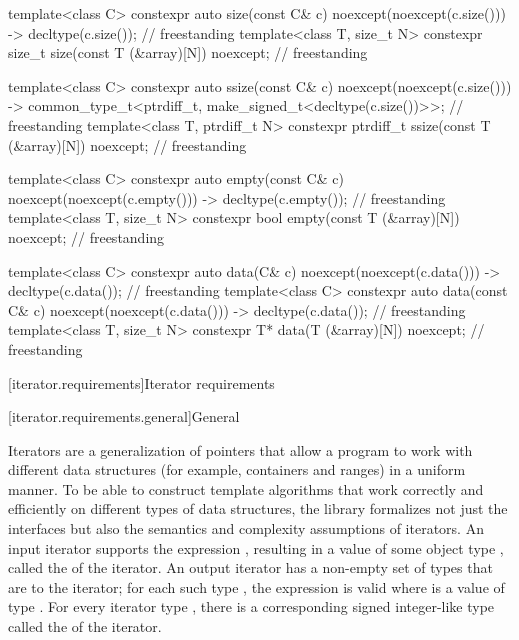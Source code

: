\begin{codeblock}
{  template<class C> constexpr auto
    size(const C& c) noexcept(noexcept(c.size())) -> decltype(c.size());            // freestanding
  template<class T, size_t N> constexpr size_t
    size(const T (&array)[N]) noexcept;                                             // freestanding

  template<class C> constexpr auto
    ssize(const C& c) noexcept(noexcept(c.size()))
      -> common_type_t<ptrdiff_t, make_signed_t<decltype(c.size())>>;               // freestanding
  template<class T, ptrdiff_t N> constexpr ptrdiff_t
    ssize(const T (&array)[N]) noexcept;                                            // freestanding

  template<class C> constexpr auto
    empty(const C& c) noexcept(noexcept(c.empty())) -> decltype(c.empty());         // freestanding
  template<class T, size_t N> constexpr bool
    empty(const T (&array)[N]) noexcept;                                            // freestanding

  template<class C> constexpr auto
    data(C& c) noexcept(noexcept(c.data())) -> decltype(c.data());                  // freestanding
  template<class C> constexpr auto
    data(const C& c) noexcept(noexcept(c.data())) -> decltype(c.data());            // freestanding
  template<class T, size_t N> constexpr T* data(T (&array)[N]) noexcept;            // freestanding
}
\end{codeblock}

[iterator.requirements]{Iterator requirements}

[iterator.requirements.general]{General}

\pnum
{}%
Iterators are a generalization of pointers that allow a \Cpp{} program to work with different data structures
(for example, containers and ranges) in a uniform manner.
To be able to construct template algorithms that work correctly and
efficiently on different types of data structures, the library formalizes not just the interfaces but also the
semantics and complexity assumptions of iterators.
An input iterator
supports the expression
,
resulting in a value of some object type
,
called the
of the iterator.
An output iterator  has a non-empty set of types that are
 to the iterator;
for each such type , the expression 
is valid where  is a value of type .
For every iterator type
,
there is a corresponding signed integer-like type called the
of the iterator.

